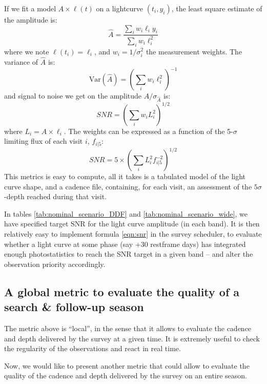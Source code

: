 \documentclass[\docopts]{\docclass}
\begin{document}
If we fit a model $A \times \ell(t)$ on a lightcurve $(t_i, y_i)$, the
least square estimate of the amplitude is:
\begin{equation}
  \hat{A} = \frac{\sum_i w_i \ell_i y_i}{\sum_i w_i \ell^2_i}
\end{equation}
where we note $\ell(t_i) = \ell_i$, and $w_i = 1 / \sigma_i^2$ the
measurement weights. The variance of $\hat{A}$ is:
\begin{equation}
  \mathrm{Var}(\hat{A}) = \left(\sum_i w_i \ell^2_i\right)^{-1}
\end{equation}
and signal to noise we get on the amplitude $\hat{A} /
\sigma_{\hat{A}}$ is:
\begin{equation}
  SNR = \left(\sum_i w_i L^2_i\right)^{1/2}
\end{equation}
where $L_i = A \times \ell_i$.  The weights can be expressed as a
function of the 5-$\sigma$ limiting flux of each visit $i$, $f_{i|5}$:
\begin{equation}
  SNR = 5 \times \left(\sum_i L^2_i f^{-2}_{i|5}\right)^{1/2}
  \label{eqn:snr}
\end{equation}
This metrics is easy to compute, all it takes is a tabulated model of
the light curve shape, and a cadence file, containing, for each visit,
an assessment of the $5\sigma$-depth reached during that visit. 

In tables \ref{tab:nominal_scenario_DDF} and
\ref{tab:nominal_scenario_wide}, we have specified target SNR for the
light curve amplitude (in each band).  It is then relatively easy to
implement formula \ref{eqn:snr} in the survey scheduler, to evaluate
whether a light curve at some phase (say +30 restframe days) has
integrated enough photostatistics to reach the SNR target in a given
band -- and alter the observation priority accordingly.


\subsection{A global metric to evaluate the quality of a search \& follow-up season}

The metric above is ``local'', in the sense that it allows to evaluate
the cadence and depth delivered by the survey at a given time. It is
extremely useful to check the regularity of the observations and react
in real time. 

Now, we would like to present another metric that could allow to
evaluate the quality of the cadence and depth delivered by the survey
on an entire season. 
\end{document}
